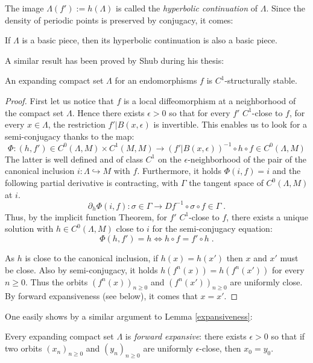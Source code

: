 \documentclass[11pt,openany,leqno]{article}
\begin{document}
The image $\Lambda(f'):= h(\Lambda)$ is called the \emph{hyperbolic continuation} of $\Lambda$. Since the density of periodic points is preserved by conjugacy, it comes: 
\begin{cor}
If $\Lambda$ is a basic piece, then its hyperbolic continuation is also a basic piece.
\end{cor}
A similar result has been proved by Shub during his thesis:
\begin{thm}
An expanding compact set $\Lambda$ for an endomorphisms $f$ is $C^1$-structurally stable.
\end{thm}
\begin{proof} First let us notice that $f$ is a local diffeomorphism at a neighborhood of the compact set $\Lambda$. Hence there exists $\epsilon>0$ so that for every $f'$ $C^1$-close to $f$, for every $x\in \Lambda$, the restriction $f'|B(x,\epsilon)$ is invertible. This enables us to look for a semi-conjugacy thanks to the map:
$$\Phi \colon (h, f')\in C^0(\Lambda,M)\times C^1(M,M) \to 
(f'|B(x,\epsilon))^{-1}\circ h\circ f  \in C^0(\Lambda,M)$$
The latter is well defined and of class $C^1$ on the $\epsilon$-neighborhood of the pair of the canonical inclusion $i\colon \Lambda\hookrightarrow M$ with $f$. Furthermore, it holds $\Phi(i,f)= i$ and the following partial derivative is contracting, with $\Gamma$ the tangent space of $C^0(\Lambda,M)$ at $i$.
 $$\partial_h \Phi (i, f) \colon  \sigma \in \Gamma \to 
Df^{-1}\circ \sigma \circ f  \in \Gamma\; .$$
Thus, by the implicit function Theorem, for $f'$ $C^1$-close to $f$, 
there exists a unique solution with $h\in C^0(\Lambda,M)$ close to $i$ for the semi-conjugacy equation:
\[\Phi(h,f')=h\Leftrightarrow h\circ f= f'\circ h\;.\]


As $h$ is close to the canonical inclusion, if $h(x)=h(x')$ then $x$ and $x'$ must be close.  Also by semi-conjugacy, it holds $h(f^n(x))=h(f^n(x'))$ for every $n\ge 0$. Thus the orbits $(f^n(x))_{n\ge 0}$ 
and $(f^n(x'))_{n\ge 0}$ are uniformly close. By forward expansiveness  (see below), it comes that $x=x'$.
\end{proof}
One easily shows by a similar argument to Lemma \ref{expansiveness}:
\begin{lemm}
Every expanding compact set $\Lambda$ is \emph{forward expansive}:
there exists $\epsilon>0$ so that if two orbits $(x_n)_{n\ge 0}$ and $(y_n)_{n\ge 0}$ are uniformly $\epsilon$-close, then $x_0=y_0$.
\end{lemm}
\end{document}
